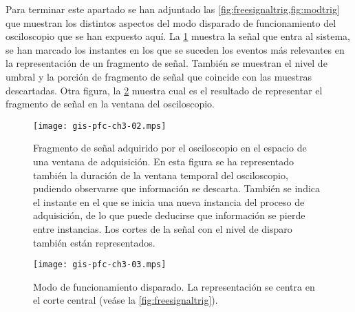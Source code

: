 Para terminar este apartado se han adjuntado las
\cref{fig:freesignaltrig,fig:modtrig} que muestran los distintos aspectos
del modo disparado de funcionamiento del osciloscopio que se han expuesto
aquí. La \cref{fig:freesignaltrig} muestra la señal que entra al sistema,
se han marcado los instantes en los que se suceden los eventos más
relevantes en la representación de un fragmento de señal. También se
muestran el nivel de umbral y la porción de fragmento de señal que coincide
con las muestras descartadas. Otra figura, la \cref{fig:modtrig} muestra
cual es el resultado de representar el fragmento de señal en la ventana del
osciloscopio.

\begin{figure}
	\begin{center}
		\texttt{[image: gis-pfc-ch3-02.mps]}
	\end{center}
	\caption[Fragmento de señal adquirido por el osciloscopio en el
	espacio de una ventana de adquisición]{Fragmento de señal adquirido
	por el osciloscopio en el espacio de una ventana de adquisición. En
	esta figura se ha representado también la duración de la ventana
	temporal del osciloscopio, pudiendo observarse que información se
	descarta. También se indica el instante en el que se inicia una
	nueva instancia del proceso de adquisición, de lo que puede
	deducirse que información se pierde entre instancias. Los cortes de
	la señal con el nivel de disparo también están representados.}
	\label{fig:freesignaltrig}
\end{figure}

\begin{figure}
	\begin{center}
		\texttt{[image: gis-pfc-ch3-03.mps]}
	\end{center}
	\caption[Modo de funcionamiento disparado]{Modo de funcionamiento
	disparado. La representación se centra en el corte central (veáse
	la \vref{fig:freesignaltrig}).}
	\label{fig:modtrig}
\end{figure}
